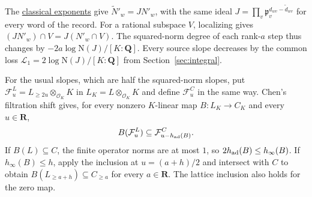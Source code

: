The \hyperlink{proof.generator-valuation-classical-trivial}{classical exponents}
give \(\widetilde N'_w=J N'_w\), with the same ideal
\(J=\prod_v\mathfrak p_v^{d_{wv}-\widetilde d_{wv}}\) for every word
of the record. For a rational subspace \(V\), localizing gives
\((J N'_w)\cap V=J(N'_w\cap V)\). The squared-norm degree of
each rank-\(a\) step thus changes by
\(-2a\log\mathrm N(J)/[K:\mathbf Q]\). Every source slope
decreases by the common loss \(\mathscr L_1=2\log\mathrm N(J)/[K:\mathbf Q]\)
from Section~\ref{sec:integral}.

\leavevmode{}%
For the usual slopes, which are half the squared-norm slopes, put
\(\mathcal F^L_u=L_{\ge 2u}\otimes_{\mathcal O_K}K\) in
\(L_K=L\otimes_{\mathcal O_K}K\) and define
\(\mathcal F^C_u\) in the same way. Chen's filtration shift gives,
for every nonzero \(K\)-linear map \(B:L_K\to C_K\) and every
\(u\in\mathbf R\),
\[
 B(\mathcal F^L_u)\subseteq \mathcal F^C_{u-h_{\rm ad}(B)}.
\]
\cite[Proposition~2.2.4, p.~42]{tr3chenHN}
If \(B(L)\subseteq C\), the finite operator norms are at most \(1\),
so \(2h_{\rm ad}(B)\le h_\infty(B)\). If \(h_\infty(B)\le h\), apply
the inclusion at \(u=(a+h)/2\) and intersect with \(C\) to obtain
\(B(L_{\ge a+h})\subseteq C_{\ge a}\) for every \(a\in\mathbf R\).
The lattice inclusion also holds for the zero map.

